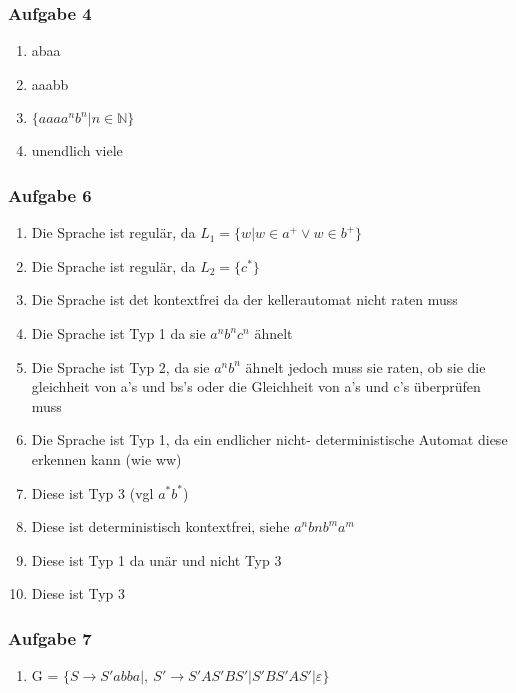 \documentclass[12pt]{scrartcl}
\begin{document}
\subsubsection{Aufgabe 4}
	\begin{enumerate}
		\item abaa
		\item aaabb
		\item \(\{aaaa^{n}b^{n}|n\in \mathbb{N}\}\)
		\item unendlich viele 
	\end{enumerate}
	
\subsubsection{Aufgabe 6}
	\begin{enumerate}
	
		\item Die Sprache ist regulär, da \(L_1 = \{w | w \in a^{+} \lor w \in b^{+} \} \)
		\item Die Sprache ist regulär, da \( L_2 = \{c^{*} \} \)
		\item Die Sprache ist det kontextfrei da der kellerautomat nicht raten muss 
		\item Die Sprache ist Typ 1 da sie \( a^{n} b^{n} c^{n} \) ähnelt
		\item Die Sprache ist Typ 2, da sie \(a^{n} b^{n} \) ähnelt jedoch muss sie raten, ob sie die gleichheit von a's und  bs's oder die Gleichheit von a's und c's überprüfen muss
		\item Die Sprache ist Typ 1, da ein endlicher nicht- deterministische Automat diese erkennen kann (wie ww)
		\item Diese ist Typ 3 (vgl \( a^{*}b^{*} \))
		\item Diese ist deterministisch kontextfrei, siehe \(a^{n}b{n} b^{m}a^{m}\)
		\item Diese ist Typ 1 da unär und nicht Typ 3
		\item Diese ist Typ 3
	\end{enumerate}

\subsubsection{Aufgabe 7}
	\begin{enumerate}
		\item G = \(\{S \rightarrow S'abba | ,\ S' \rightarrow S'AS'BS'| S'BS'AS'|\varepsilon \}\)
	\end{enumerate}
\end{document}
